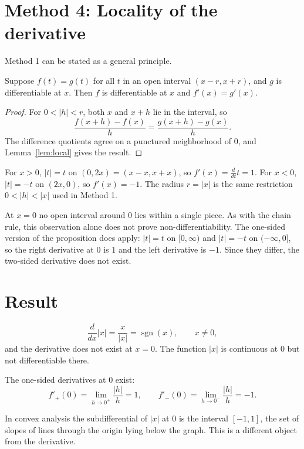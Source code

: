 \documentclass{essay}
\DeclareMathOperator{\sgn}{sgn}
\newcommand{\abs}[1]{\lvert #1 \rvert}
\begin{document}
\section{Method 4: Locality of the derivative}

Method 1 can be stated as a general principle.

\begin{proposition}
  Suppose $f(t) = g(t)$ for all $t$ in an open interval $(x - r, x + r)$, and
  $g$ is differentiable at $x$. Then $f$ is differentiable at $x$ and
  $f'(x) = g'(x)$.
\end{proposition}

\begin{proof}
  For $0 < \abs{h} < r$, both $x$ and $x + h$ lie in the interval, so
  \[
    \frac{f(x+h) - f(x)}{h} = \frac{g(x+h) - g(x)}{h}.
  \]
  The difference quotients agree on a punctured neighborhood of $0$, and
  Lemma~\ref{lem:local} gives the result.
\end{proof}

For $x > 0$, $\abs{t} = t$ on $(0, 2x) = (x - x, x + x)$, so
$f'(x) = \frac{d}{dt} t = 1$. For $x < 0$, $\abs{t} = -t$ on $(2x, 0)$, so
$f'(x) = -1$. The radius $r = \abs{x}$ is the same restriction
$0 < \abs{h} < \abs{x}$ used in Method 1.

At $x = 0$ no open interval around $0$ lies within a single piece. As with the
chain rule, this observation alone does not prove non-differentiability. The
one-sided version of the proposition does apply: $\abs{t} = t$ on $[0, \infty)$
and $\abs{t} = -t$ on $(-\infty, 0]$, so the right derivative at $0$ is $1$ and
the left derivative is $-1$. Since they differ, the two-sided derivative does
not exist.

\section{Result}

\[
  \frac{d}{dx}\abs{x} = \frac{x}{\abs{x}} = \sgn(x), \qquad x \neq 0,
\]
and the derivative does not exist at $x = 0$. The function $\abs{x}$ is
continuous at $0$ but not differentiable there.

\begin{remark}
  The one-sided derivatives at $0$ exist:
  \[
    f'_+(0) = \lim_{h \to 0^+} \frac{\abs{h}}{h} = 1, \qquad
    f'_-(0) = \lim_{h \to 0^-} \frac{\abs{h}}{h} = -1.
  \]
\end{remark}

\begin{remark}
  In convex analysis the subdifferential of $\abs{x}$ at $0$ is the interval
  $[-1, 1]$, the set of slopes of lines through the origin lying below the
  graph. This is a different object from the derivative.
\end{remark}
\end{document}
